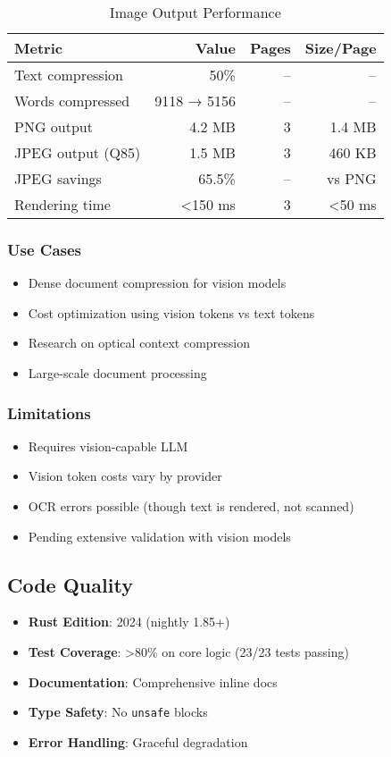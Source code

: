 \begin{table}[h]
\centering
\caption{Image Output Performance}
\label{tab:image-output}
\begin{tabular}{lrrr}
\toprule
Metric & Value & Pages & Size/Page \\
\midrule
Text compression & 50\% & -- & -- \\
Words compressed & 9118 → 5156 & -- & -- \\
PNG output & 4.2 MB & 3 & 1.4 MB \\
JPEG output (Q85) & 1.5 MB & 3 & 460 KB \\
JPEG savings & 65.5\% & -- & vs PNG \\
Rendering time & <150 ms & 3 & <50 ms \\
\bottomrule
\end{tabular}
\end{table}

\subsubsection{Use Cases}

\begin{itemize}
    \item Dense document compression for vision models
    \item Cost optimization using vision tokens vs text tokens
    \item Research on optical context compression
    \item Large-scale document processing
\end{itemize}

\subsubsection{Limitations}

\begin{itemize}
    \item Requires vision-capable LLM
    \item Vision token costs vary by provider
    \item OCR errors possible (though text is rendered, not scanned)
    \item Pending extensive validation with vision models
\end{itemize}

\subsection{Code Quality}

\begin{itemize}
    \item \textbf{Rust Edition}: 2024 (nightly 1.85+)
    \item \textbf{Test Coverage}: >80\% on core logic (23/23 tests passing)
    \item \textbf{Documentation}: Comprehensive inline docs
    \item \textbf{Type Safety}: No \texttt{unsafe} blocks
    \item \textbf{Error Handling}: Graceful degradation
\end{itemize}
